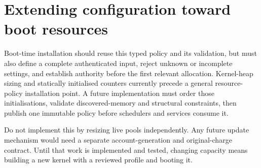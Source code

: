 \section{Extending configuration toward boot resources}

Boot-time installation should reuse this typed policy and its validation, but
must also define a complete authenticated input, reject unknown or incomplete
settings, and establish authority before the first relevant allocation.
Kernel-heap sizing and statically initialised counters currently precede a
general resource-policy installation point. A future implementation must order
those initialisations, validate discovered-memory and structural constraints,
then publish one immutable policy before schedulers and services consume it.

Do not implement this by resizing live pools independently. Any future update
mechanism would need a separate account-generation and original-charge contract.
Until that work is implemented and tested, changing capacity means building a
new kernel with a reviewed profile and booting it.

\endinput
